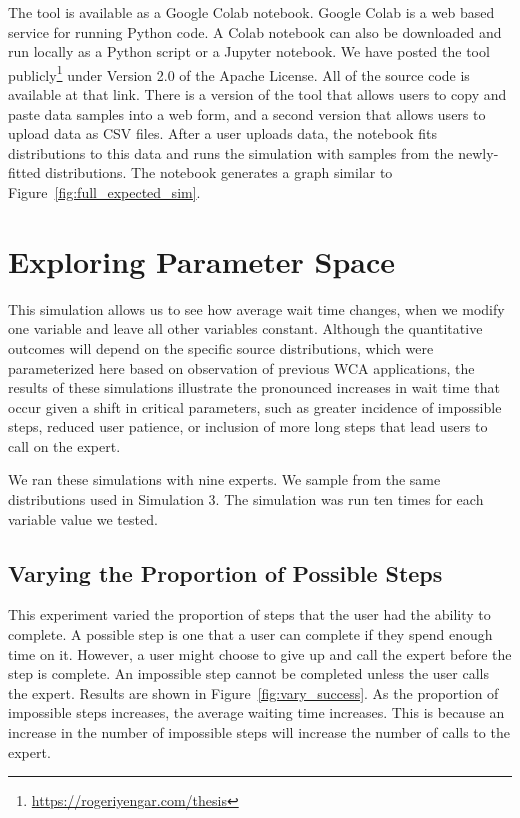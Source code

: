 The tool is available as a Google Colab notebook.
Google Colab is a web based service for running Python code.
A Colab notebook can also be downloaded and run locally as a Python script or a
Jupyter notebook.
We have posted the tool
publicly\footnote{\url{https://rogeriyengar.com/thesis}} under Version 2.0 of
the Apache License.
All of the source code is available at that link.
There is a version of the tool that allows users to copy and paste data samples
into a web form, and a second version that allows users to upload data as CSV
files.
After a user uploads data, the notebook fits distributions to this data and
runs the simulation with samples from the newly-fitted distributions.
The notebook generates a graph similar to Figure~\ref{fig:full_expected_sim}.

\section{Exploring Parameter Space}

This simulation allows us to see how average wait time changes, when we modify
one variable and leave all other variables constant.
Although the quantitative outcomes will depend on the specific source
distributions, which were parameterized here based on observation of previous
WCA applications, the results of these simulations illustrate the pronounced
increases in wait time that occur given a shift in critical parameters, such as
greater incidence of impossible steps, reduced user patience, or inclusion of
more long steps that lead users to call on the expert.

We ran these simulations with nine experts.
We sample from the same distributions used in Simulation 3.
The simulation was run ten times for each variable value we tested.

\subsection{Varying the Proportion of Possible Steps}

This experiment varied the proportion of steps that the user had the ability to
complete.
A possible step is one that a user can complete if they spend enough time on it.
However, a user might choose to give up and call the expert before the step is
complete.
An impossible step cannot be completed unless the user calls the expert.
Results are shown in Figure~\ref{fig:vary_success}.
As the proportion of impossible steps increases, the average waiting time
increases.
This is because an increase in the number of impossible steps will increase the
number of calls to the expert.

